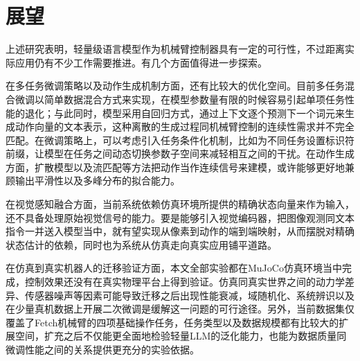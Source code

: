 \section{展望}\label{sec:conclusion-outlook}

上述研究表明，轻量级语言模型作为机械臂控制器具有一定的可行性，不过距离实际应用仍有不少工作需要推进。有几个方面值得进一步探索。

在多任务微调策略以及动作生成机制方面，还有比较大的优化空间。目前多任务混合微调以简单数据混合方式来实现，在模型参数量有限的时候容易引起单项任务性能的退化；与此同时，模型采用自回归方式，通过上下文逐个预测下一个词元来生成动作向量的文本表示，这种离散的生成过程同机械臂控制的连续性需求并不完全匹配。在微调策略上，可以考虑引入任务条件化机制，比如为不同任务设置标识符前缀，让模型在任务之间动态切换参数子空间来减轻相互之间的干扰。在动作生成方面，扩散模型以及流匹配等方法把动作当作连续信号来建模，或许能够更好地兼顾输出平滑性以及多峰分布的拟合能力。

在视觉感知融合方面，当前系统依赖仿真环境所提供的精确状态向量来作为输入，还不具备处理原始视觉信号的能力。要是能够引入视觉编码器，把图像观测同文本指令一并送入模型当中，就有望实现从像素到动作的端到端映射，从而摆脱对精确状态估计的依赖，同时也为系统从仿真走向真实应用铺平道路。

在仿真到真实机器人的迁移验证方面，本文全部实验都在MuJoCo仿真环境当中完成，控制效果还没有在真实物理平台上得到验证。仿真同真实世界之间的动力学差异、传感器噪声等因素可能导致迁移之后出现性能衰减，域随机化、系统辨识以及在少量真机数据上开展二次微调是缓解这一问题的可行途径。另外，当前数据集仅覆盖了Fetch机械臂的四项基础操作任务，任务类型以及数据规模都有比较大的扩展空间，扩充之后不仅能更全面地检验轻量LLM的泛化能力，也能为数据质量同微调性能之间的关系提供更充分的实验依据。
